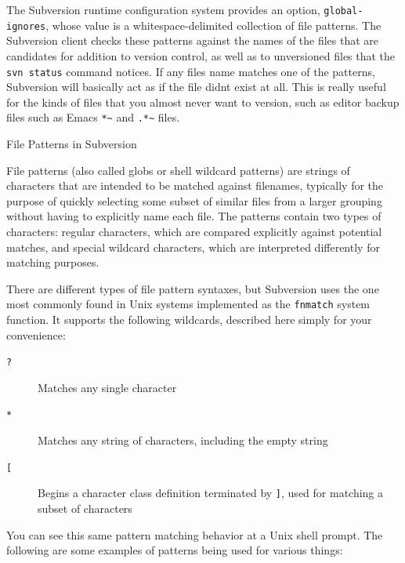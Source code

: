 The Subversion runtime configuration system provides an option,
\texttt{global-ignores}, whose value is a whitespace-delimited
collection of file patterns. The Subversion client checks these patterns
against the names of the files that are candidates for addition to
version control, as well as to unversioned files that the
\texttt{svn\ status} command notices. If any file\textquotesingle s name
matches one of the patterns, Subversion will basically act as if the
file didn\textquotesingle t exist at all. This is really useful for the
kinds of files that you almost never want to version, such as editor
backup files such as Emacs\textquotesingle{} \texttt{*\textasciitilde{}}
and \texttt{.*\textasciitilde{}} files.

File Patterns in Subversion

File patterns (also called globs or shell wildcard patterns) are strings
of characters that are intended to be matched against filenames,
typically for the purpose of quickly selecting some subset of similar
files from a larger grouping without having to explicitly name each
file. The patterns contain two types of characters: regular characters,
which are compared explicitly against potential matches, and special
wildcard characters, which are interpreted differently for matching
purposes.

There are different types of file pattern syntaxes, but Subversion uses
the one most commonly found in Unix systems implemented as the
\texttt{fnmatch} system function. It supports the following wildcards,
described here simply for your convenience:

\begin{description}
\item[\texttt{?}]
Matches any single character
\item[\texttt{*}]
Matches any string of characters, including the empty string
\item[\texttt{{[}}]
Begins a character class definition terminated by \texttt{{]}}, used for
matching a subset of characters
\end{description}

You can see this same pattern matching behavior at a Unix shell prompt.
The following are some examples of patterns being used for various
things:

